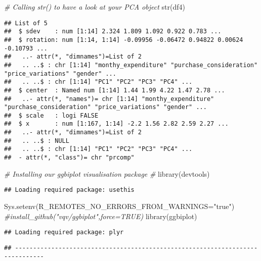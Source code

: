 \documentclass[
]{article}
\newenvironment{Shaded}{\begin{snugshade}}{\end{snugshade}}
\newcommand{\AttributeTok}[1]{\textcolor[rgb]{0.77,0.63,0.00}{#1}}
\newcommand{\CommentTok}[1]{\textcolor[rgb]{0.56,0.35,0.01}{\textit{#1}}}
\newcommand{\FunctionTok}[1]{\textcolor[rgb]{0.00,0.00,0.00}{#1}}
\newcommand{\NormalTok}[1]{#1}
\newcommand{\StringTok}[1]{\textcolor[rgb]{0.31,0.60,0.02}{#1}}
\begin{document}
\begin{Shaded}
\begin{Highlighting}[]
\CommentTok{\# Calling str() to have a look at your PCA object}
\FunctionTok{str}\NormalTok{(df4)}
\end{Highlighting}
\end{Shaded}

\begin{verbatim}
## List of 5
##  $ sdev    : num [1:14] 2.324 1.809 1.092 0.922 0.783 ...
##  $ rotation: num [1:14, 1:14] -0.09956 -0.06472 0.94822 0.00624 -0.10793 ...
##   ..- attr(*, "dimnames")=List of 2
##   .. ..$ : chr [1:14] "monthy_expenditure" "purchase_consideration" "price_variations" "gender" ...
##   .. ..$ : chr [1:14] "PC1" "PC2" "PC3" "PC4" ...
##  $ center  : Named num [1:14] 1.44 1.99 4.22 1.47 2.78 ...
##   ..- attr(*, "names")= chr [1:14] "monthy_expenditure" "purchase_consideration" "price_variations" "gender" ...
##  $ scale   : logi FALSE
##  $ x       : num [1:167, 1:14] -2.2 1.56 2.82 2.59 2.27 ...
##   ..- attr(*, "dimnames")=List of 2
##   .. ..$ : NULL
##   .. ..$ : chr [1:14] "PC1" "PC2" "PC3" "PC4" ...
##  - attr(*, "class")= chr "prcomp"
\end{verbatim}

\begin{Shaded}
\begin{Highlighting}[]
\CommentTok{\# Installing our ggbiplot visualisation package}
\CommentTok{\# }
\FunctionTok{library}\NormalTok{(devtools)}
\end{Highlighting}
\end{Shaded}

\begin{verbatim}
## Loading required package: usethis
\end{verbatim}

\begin{Shaded}
\begin{Highlighting}[]
\FunctionTok{Sys.setenv}\NormalTok{(}\AttributeTok{R\_REMOTES\_NO\_ERRORS\_FROM\_WARNINGS=}\StringTok{"true"}\NormalTok{)}
\CommentTok{\#install\_github("vqv/ggbiplot",force=TRUE)}
\FunctionTok{library}\NormalTok{(ggbiplot)}
\end{Highlighting}
\end{Shaded}

\begin{verbatim}
## Loading required package: plyr
\end{verbatim}

\begin{verbatim}
## ------------------------------------------------------------------------------
\end{verbatim}
\end{document}
